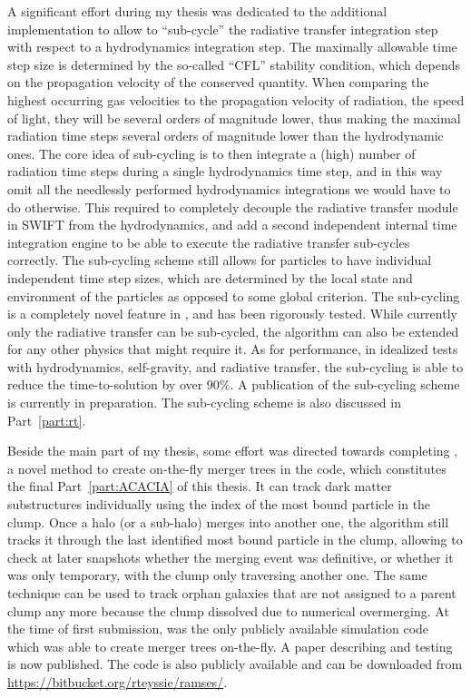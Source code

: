 A significant effort during my thesis was dedicated to the additional implementation to allow \swift
to ``sub-cycle'' the radiative transfer integration step with respect to a hydrodynamics integration
step. The maximally allowable time step size is determined by the so-called ``CFL'' stability
condition, which depends on the propagation velocity of the conserved quantity. When comparing the
highest occurring gas velocities to the propagation velocity of radiation, the speed of light, they
will be several orders of magnitude lower, thus making the maximal radiation time steps several
orders of magnitude lower than the hydrodynamic ones. The core idea of sub-cycling is to then
integrate a (high) number of radiation time steps during a single hydrodynamics time step, and in
this way omit all the needlessly performed hydrodynamics integrations we would have to do otherwise.
This required to completely decouple the radiative transfer module in SWIFT from the hydrodynamics,
and add a second independent internal time integration engine to be able to execute the radiative
transfer sub-cycles correctly. The sub-cycling scheme still allows for particles to have individual
independent time step sizes, which are determined by the local state and environment of the
particles as opposed to some global criterion. The sub-cycling is a completely novel feature in
\swift, and has been rigorously tested. While currently only the radiative transfer can be
sub-cycled, the algorithm can also be extended for any other physics that might require it. As
for performance, in idealized tests with hydrodynamics, self-gravity, and radiative transfer, the
sub-cycling is able to reduce the time-to-solution by over 90$\%$. A publication of the sub-cycling
scheme is currently in preparation. The sub-cycling scheme is also discussed in Part~\ref{part:rt}.


Beside the main part of my thesis, some effort was directed towards completing \acacia, a
novel method to create on-the-fly merger trees in the \ramses code, which constitutes the final
Part~\ref{part:ACACIA} of this thesis. It can track dark matter substructures individually using
the index of the most bound particle in the clump. Once a halo (or a sub-halo) merges into another
one, the algorithm still tracks it through the last identified most bound particle in the clump,
allowing to check at later snapshots whether the merging event was definitive, or whether it was
only temporary, with the clump only traversing another one. The same technique can be used to track
orphan galaxies that are not assigned to a parent clump any more because the clump dissolved due to
numerical overmerging. At the time of first submission, \ramses was the only publicly available
simulation code which was able to create merger trees on-the-fly. A paper describing and testing
\acacia is now published. The \ramses code is also publicly available and can be downloaded from
\url{https://bitbucket.org/rteyssie/ramses/}.
